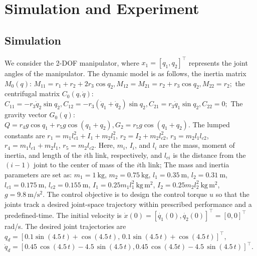 \documentclass[pdflatex,sn-mathphys-num]{sn-jnl}%
\theoremstyle{thmstyleone}%
\theoremstyle{thmstyletwo}%
\theoremstyle{thmstylethree}%
\begin{document}
\section{Simulation and Experiment}
\subsection{Simulation}
\par We consider the 2-DOF manipulator, where $x_1 = [q_1, q_2]^{\top}$ represents the joint angles of the manipulator. The dynamic model is as follows, the inertia matrix $M_0(q)$:
$M_{11}=r_1+r_2+2r_3\cos q_2, M_{12}=M_{21}=r_2+r_3\cos q_2, M_{22}=r_2;$
the centrifugal matrix $C_0(q,\dot q)$:
$C_{11}=-r_3\dot q_2\sin q_2, C_{12}=-r_3(\dot q_1+\dot q_2)\sin q_2, C_{21}=r_3\dot q_1\sin q_2, C_{22}=0;$
The gravity vector $G_0(q)$:
$Q=r_4 g\cos q_1+r_5 g\cos(q_1+q_2), G_2=r_5 g\cos(q_1+q_2)$.
The lumped constants are \( r_1 = m_1 l_{c1}^2 + I_1 + m_2 l_1^2 \),
\( r_2 = I_2 + m_2 l_{c2}^2 \),
\( r_3 = m_2 l_1 l_{c2} \),
\( r_4 = m_1 l_{c1} + m_2 l_1 \),
\( r_5 = m_2 l_{c2} \).
Here, \(m_i\), \(I_i\), and \(l_i\) are the mass, moment of inertia, and length of the \(i\)th link, respectively, and \(l_{ci}\) is the distance from the $(i-1)$ joint to the center of mass of the \(i\)th link; The mass and inertia parameters are set as: \( m_1 = 1 \ \mathrm{kg} \), \( m_2 = 0.75 \ \mathrm{kg} \), \( l_1 = 0.35 \ \mathrm{m} \), \( l_2 = 0.31 \ \mathrm{m} \), \( l_{c1} = 0.175 \ \mathrm{m} \), \( l_{c2} = 0.155 \ \mathrm{m} \), \( I_1 = 0.25 m_1 l_1^2 \ \mathrm{kg \, m^2} \), \( I_2 = 0.25 m_2 l_2^2 \ \mathrm{kg \, m^2} \), \( g = 9.8 \ \mathrm{m/s^2} \).
The control objective is to design the control torque \( u \) so that the joints track a desired joint-space trajectory within prescribed performance and a predefined-time. The initial velocity is $\dot{x}(0)=[\dot{q_1}(0),\dot{q_2}(0)]^{\top}=[0,0]^{\top}$ rad/s. The desired joint trajectories are \( q_{d} = [ 0.1 \sin(4.5\,t)+\cos(4.5\,t), \, 0.1 \sin(4.5\,t)+\cos(4.5\,t)]^{\top} \), \( \dot{q}_d = [ 0.45\,\cos\left(4.5\,t\right) - 4.5\,\sin\left(4.5\,t\right), 0.45\,\cos\left(4.5 t\right) - 4.5\,\sin\left(4.5\,t\right)]^{\top} \).
\end{document}
